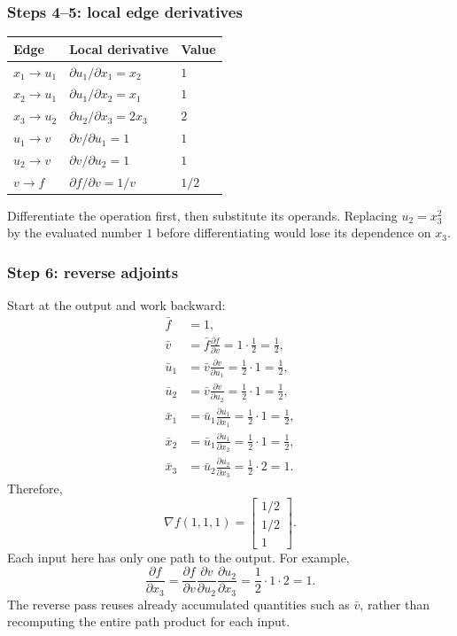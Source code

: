 \subsubsection*{Steps 4--5: local edge derivatives}
\begin{center}
\renewcommand{\arraystretch}{1.25}
\begin{tabular}{lll}
\toprule
Edge & Local derivative & Value\\
\midrule
$x_1\to u_1$ & $\partial u_1/\partial x_1=x_2$ & $1$\\
$x_2\to u_1$ & $\partial u_1/\partial x_2=x_1$ & $1$\\
$x_3\to u_2$ & $\partial u_2/\partial x_3=2x_3$ & $2$\\
$u_1\to v$ & $\partial v/\partial u_1=1$ & $1$\\
$u_2\to v$ & $\partial v/\partial u_2=1$ & $1$\\
$v\to f$ & $\partial f/\partial v=1/v$ & $1/2$\\
\bottomrule
\end{tabular}
\end{center}
Differentiate the operation first, then substitute its operands. Replacing $u_2=x_3^2$ by the evaluated number $1$ before differentiating would lose its dependence on $x_3$.

\subsubsection*{Step 6: reverse adjoints}
Start at the output and work backward:
\begin{align*}
 \bar f&=1,\\
 \bar v&=\bar f\frac{\partial f}{\partial v}
       =1\cdot\frac12=\frac12,\\
 \bar u_1&=\bar v\frac{\partial v}{\partial u_1}
       =\frac12\cdot1=\frac12,\\
 \bar u_2&=\bar v\frac{\partial v}{\partial u_2}
       =\frac12\cdot1=\frac12,\\
 \bar x_1&=\bar u_1\frac{\partial u_1}{\partial x_1}
       =\frac12\cdot1=\frac12,\\
 \bar x_2&=\bar u_1\frac{\partial u_1}{\partial x_2}
       =\frac12\cdot1=\frac12,\\
 \bar x_3&=\bar u_2\frac{\partial u_2}{\partial x_3}
       =\frac12\cdot2=1.
\end{align*}
Therefore,
\[
 \boxed{\nabla f(1,1,1)=\begin{bmatrix}1/2\\1/2\\1\end{bmatrix}.}
\]
Each input here has only one path to the output. For example,
\[
 \frac{\partial f}{\partial x_3}
 =\frac{\partial f}{\partial v}
  \frac{\partial v}{\partial u_2}
  \frac{\partial u_2}{\partial x_3}
 =\frac12\cdot1\cdot2=1.
\]
The reverse pass reuses already accumulated quantities such as $\bar v$, rather than recomputing the entire path product for each input.

